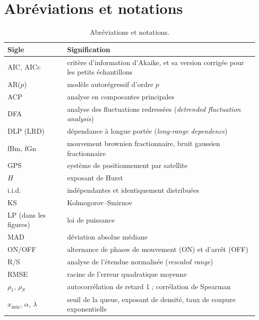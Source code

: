 \documentclass[11pt,a4paper]{article}
\renewcommand{\_}{\textunderscore\penalty0\hspace{0pt}}
\begin{document}
\section{Abréviations et notations}
\label{app:abrev}

\begin{table}[H]
\centering
\caption{Abréviations et notations.}
\small
\begin{tabular}{@{}p{3.2cm}p{11.3cm}@{}}
\toprule
Sigle & Signification \\
\midrule
AIC, AICc & critère d'information d'Akaike, et sa version corrigée pour les petits échantillons \\
AR($p$) & modèle autorégressif d'ordre $p$ \\
ACP & analyse en composantes principales \\
DFA & analyse des fluctuations redressées (\emph{detrended fluctuation analysis}) \\
DLP (LRD) & dépendance à longue portée (\emph{long-range dependence}) \\
fBm, fGn & mouvement brownien fractionnaire, bruit gaussien fractionnaire \\
GPS & système de positionnement par satellite \\
$H$ & exposant de Hurst \\
i.i.d. & indépendantes et identiquement distribuées \\
KS & Kolmogorov--Smirnov \\
LP (dans les figures) & loi de puissance \\
MAD & déviation absolue médiane \\
ON/OFF & alternance de phases de mouvement (ON) et d'arrêt (OFF) \\
R/S & analyse de l'étendue normalisée (\emph{rescaled range}) \\
RMSE & racine de l'erreur quadratique moyenne \\
$\rho_1$, $\rho_S$ & autocorrélation de retard 1 ; corrélation de Spearman \\
$x_{\min}$, $\alpha$, $\lambda$ & seuil de la queue, exposant de densité, taux de coupure exponentielle \\
\bottomrule
\end{tabular}
\end{table}

\end{document}
